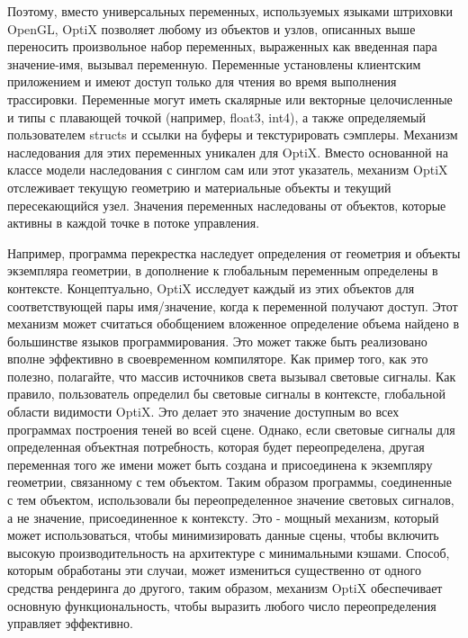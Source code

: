 Поэтому, вместо универсальных переменных, используемых языками штриховки OpenGL, OptiX позволяет любому из объектов и узлов, описанных выше переносить произвольное набор переменных, выраженных как введенная пара значение-имя, вызывал переменную. Переменные установлены клиентским приложением и имеют доступ только для чтения во время выполнения трассировки. Переменные могут иметь скалярные или векторные целочисленные и типы с плавающей точкой (например, float3, int4), а также определяемый пользователем structs и ссылки на буферы и текстурировать сэмплеры. Механизм наследования для этих переменных уникален для OptiX. Вместо основанной на классе модели наследования с синглом сам или этот указатель, механизм OptiX отслеживает текущую геометрию и материальные объекты и текущий пересекающийся узел. Значения переменных наследованы от объектов, которые активны в каждой точке в потоке управления.

  Например, программа перекрестка наследует определения от геометрия и объекты экземпляра геометрии, в дополнение к глобальным переменным определены в контексте. Концептуально, OptiX исследует каждый из этих объектов для соответствующей пары имя/значение, когда к переменной получают доступ. Этот механизм может считаться обобщением вложенное определение объема найдено в большинстве языков программирования. Это может также быть реализовано вполне эффективно в своевременном компиляторе. Как пример того, как это полезно, полагайте, что массив источников света вызывал световые сигналы. Как правило, пользователь определил бы световые сигналы в контексте, глобальной области видимости OptiX. Это делает это значение доступным во всех программах построения теней во всей сцене. Однако, если световые сигналы для определенная объектная потребность, которая будет переопределена, другая переменная того же имени может быть создана и присоединена к экземпляру геометрии, связанному с тем объектом. Таким образом программы, соединенные с тем объектом, использовали бы переопределенное значение световых сигналов, а не значение, присоединенное к контексту. Это - мощный механизм, который может использоваться, чтобы минимизировать данные сцены, чтобы включить высокую производительность на архитектуре с минимальными кэшами. Способ, которым обработаны эти случаи, может измениться существенно от одного средства рендеринга до другого, таким образом, механизм OptiX обеспечивает основную функциональность, чтобы выразить любого число переопределения управляет эффективно.

